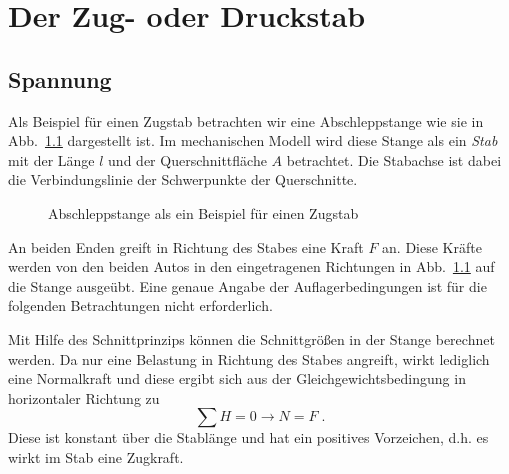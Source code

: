 
\chapter{Der Zug- oder Druckstab}

\section{Spannung}

Als Beispiel für einen Zugstab betrachten wir eine Abschleppstange wie sie in Abb.~\ref{fig:1-1} dargestellt ist.
Im mechanischen Modell wird diese Stange als ein \emph{Stab} mit der Länge $l$ und der Querschnittfläche $A$ betrachtet.
Die Stabachse ist dabei die Verbindungslinie der Schwerpunkte der Querschnitte. 

\begin{figure}[h!]
	\centering
	
	\caption{Abschleppstange als ein Beispiel für einen Zugstab}
	\label{fig:1-1}
\end{figure}

An beiden Enden greift in Richtung des Stabes eine Kraft $F$ an.
Diese Kräfte werden von den beiden Autos in den eingetragenen Richtungen in Abb.~\ref{fig:1-1} auf die Stange ausgeübt.
Eine genaue Angabe der Auflagerbedingungen ist für die folgenden Betrachtungen nicht erforderlich.

Mit Hilfe des Schnittprinzips können die Schnittgrößen in der Stange berechnet werden.
Da nur eine Belastung in Richtung des Stabes angreift, wirkt lediglich eine Normalkraft und diese ergibt sich aus der Gleichgewichtsbedingung in horizontaler Richtung zu 
%
\begin{equation}
\sum H=0 \rightarrow N=F \; .
\label{eq:1-2}
\end{equation}
%
Diese ist konstant über die Stablänge und hat ein positives Vorzeichen, d.h. es wirkt im Stab eine Zugkraft.

